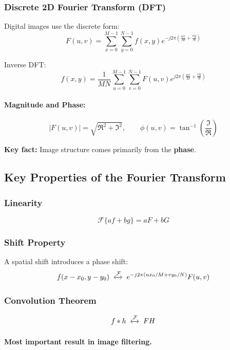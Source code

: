 \documentclass{AnantDocumentation}
\begin{document}
\subsubsection{Discrete 2D Fourier Transform (DFT)}

Digital images use the discrete form:
\begin{equation}
F(u,v) =
\sum_{x=0}^{M-1} \sum_{y=0}^{N-1}
f(x,y)e^{-j2\pi \left( \frac{ux}{M} + \frac{vy}{N} \right)}
\end{equation}

Inverse DFT:
\begin{equation}
f(x,y) = \frac{1}{MN}
\sum_{u=0}^{M-1} \sum_{v=0}^{N-1}
F(u,v)e^{j2\pi \left( \frac{ux}{M} + \frac{vy}{N} \right)}
\end{equation}

\paragraph{Magnitude and Phase:}
\[
|F(u,v)| = \sqrt{\Re^2 + \Im^2}, \qquad
\phi(u,v) = \tan^{-1}\left(\frac{\Im}{\Re}\right)
\]

\textbf{Key fact:} Image structure comes primarily from the \textbf{phase}.

\subsection{Key Properties of the Fourier Transform}

\subsubsection{Linearity}
\[
\mathcal{F}\{af + bg\} = aF + bG
\]

\subsubsection{Shift Property}
A spatial shift introduces a phase shift:
\[
f(x-x_0, y-y_0)
\; \xleftrightarrow{\mathcal{F}} \;
e^{-j2\pi(ux_0/M + vy_0/N)}F(u,v)
\]

\subsubsection{Convolution Theorem}
\[
f * h \;\xleftrightarrow{\mathcal{F}}\; FH
\]

\paragraph{Most important result in image filtering.}
\end{document}
